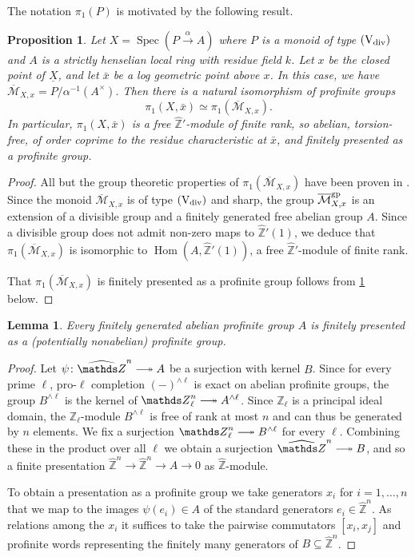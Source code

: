 \documentclass[a4paper,twoside,11pt,reqno]{amsart}
\renewcommand{\mathbb}{\mathds}
\newcommand{\bZ}{{\mathbb Z}}
\newcommand{\cM}{{\mathcal M}}
\DeclareRobustCommand\longtwoheadrightarrow {\relbar\joinrel\twoheadrightarrow}
\newcommand{\surj}{\longtwoheadrightarrow}
\DeclareMathOperator{\Hom}{Hom}
\DeclareMathOperator{\Spec}{Spec}
\newcommand{\hZ}{{\widehat{\bZ}}}
\newcommand{\typeVd}{(\mathrm{V}_{\rm div})}
\newtheorem{prop}[thm]{Proposition}
\newtheorem{lem}[thm]{Lemma}
\theoremstyle{definition}
\numberwithin{equation}{subsection}
\begin{document}
The notation $\pi_1(P)$ is motivated by the following result.

\begin{prop} \label{prop:FKEt-pi1-local}
    Let $X = \Spec(P\overset{\alpha}{\to} A)$ where $P$ is a monoid of type $\typeVd$ and $A$ is a strictly henselian local ring with residue field $k$. Let $x$ be the closed point of $\underline{X}$, and let $\bar{x}$ be a log geometric point above $x$. In this case, we have $\overline{\cM}_{X,x} = P/\alpha^{-1}(A^\times)$.  Then there is a natural isomorphism of profinite groups
    \[ 
        \pi_1(X, \bar{x}) \simeq \pi_1(\overline{\cM}_{X,x}).
    \]
    In particular, $\pi_1(X, \bar{x})$ is a free $\hZ'$-module of finite rank, so abelian, torsion-free, of order coprime 
    to the residue characteristic at $\bar{x}$, and finitely presented as a profinite group.
\end{prop}
\begin{proof}
All but the group theoretic properties of $\pi_1(\overline{\cM}_{X,x})$ have been proven in \cite[Proposition~4.3.1]{AHLS-Log}.
Since the monoid $\overline{\cM}_{X,x}$ is of type $\typeVd$ and sharp, the group 
$\overline{\cM}_{X,x}^{\rm gp}$ is an extension of a divisible group and a finitely generated free abelian group $A$. Since a divisible group does not admit non-zero maps to $\widehat{\bZ}'(1)$, we deduce that
$\pi_1(\overline{\cM}_{X,x})$ is isomorphic to $\Hom(A,\hZ'(1))$, a free $\widehat{\bZ}'$-module of finite rank.

That $\pi_1(\overline{\cM}_{X,x})$ is finitely presented as a profinite group follows from 
\cref{lem:abelian-fg-implies-finitely-presented} below.
\end{proof}

\begin{lem} \label{lem:abelian-fg-implies-finitely-presented}
    Every finitely generated abelian profinite group $A$ is finitely presented as a (potentially nonabelian) profinite group.
\end{lem}

\begin{proof}
    Let $\psi \colon \hZ^n \surj A$ be a surjection with kernel $B$. Since for every prime $\ell$, pro-$\ell$ completion $(-)^{\wedge \ell}$ is exact on abelian profinite groups, the group $B^{\wedge \ell}$ is the kernel of $\bZ_\ell^n \surj A^{\wedge \ell}$. Since $\bZ_\ell$ is a principal ideal domain, the $\bZ_\ell$-module $B^{\wedge \ell}$ is free of rank at most $n$ and can thus be generated by $n$ elements. We fix a surjection $\bZ_\ell^n \surj B^{\wedge \ell}$ for every $\ell$. Combining these in the product over all $\ell$ we obtain a surjection $\hZ^n \surj B$, and so a finite presentation $\hZ^n \to \hZ^n \to A \to 0$ as $\hZ$-module. 

    To obtain a presentation as a profinite group we take generators $x_i$ for $i=1,\ldots,n$ that we map to the images $\psi(e_i) \in A$ of the standard generators $e_i \in \hZ^n$. As relations among the $x_i$ it suffices to take the pairwise commutators $[x_i,x_j]$ and profinite words representing the finitely many generators of $B \subseteq \hZ^n$. 
\end{proof}
\end{document}

